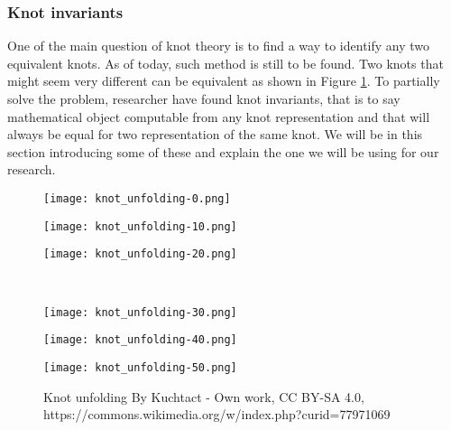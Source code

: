 \documentclass[12pt, a4paper]{article}
\begin{document}
\subsubsection{Knot invariants}

One of the main question of knot theory is to find a way to identify any two equivalent knots. As of today, such method is still to be found. Two knots that might seem very different can be equivalent as shown in Figure \ref{fig:unknot}. To partially solve the problem, researcher have found knot invariants, that is to say mathematical object computable from any knot representation and that will always be equal for two representation of the same knot. We will be in this section introducing some of these and explain the one we will be using for our research.\\

\begin{figure}[H]
  \begin{minipage}[c]{.2\textwidth}
  \centering
  \texttt{[image: knot\_unfolding-0.png]}
    
  \end{minipage}
  \hfill
  \begin{minipage}[c]{.2\textwidth}
  \centering
  \texttt{[image: knot\_unfolding-10.png]}
    
  \end{minipage}
  \hfill
  \begin{minipage}[c]{.2\textwidth}
  \centering
  \texttt{[image: knot\_unfolding-20.png]}
    
  \end{minipage}\\
  \begin{minipage}[c]{.2\textwidth}
  \centering
  \texttt{[image: knot\_unfolding-30.png]}
    
  \end{minipage}
  \hfill
  \begin{minipage}[c]{.2\textwidth}
  \centering
  \texttt{[image: knot\_unfolding-40.png]}
    
  \end{minipage}
  \hfill
  \begin{minipage}[c]{.2\textwidth}
  \centering
  \texttt{[image: knot\_unfolding-50.png]}
    
  \end{minipage}
  \caption{Knot unfolding By Kuchtact - Own work, CC BY-SA 4.0, https://commons.wikimedia.org/w/index.php?curid=77971069}
  \label{fig:unknot}
  
\end{figure}
\end{document}
